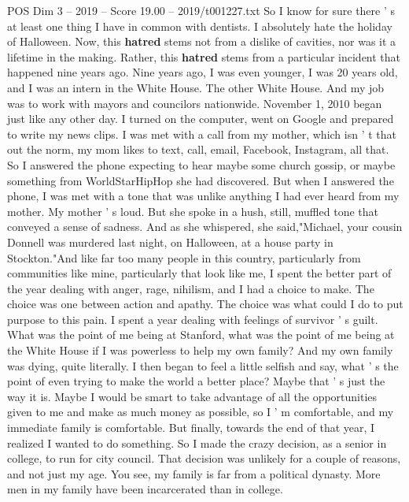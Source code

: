 \begin{textsample}{POS Dim 3 – 2019 – Score 19.00 – 2019/t001227.txt}  \label{ex:f3_pos_005}
So I know for sure there ' s at least one thing I have in common with dentists.
I absolutely hate the holiday of Halloween.
Now, this \textbf{hatred} stems not from a dislike of cavities, nor was it a lifetime in the making.
Rather, this \textbf{hatred} stems from a particular incident that happened nine years ago.
Nine years ago, I was even younger, I was 20 years old, and I was an intern in the White House.
The other White House.
And my job was to work with mayors and councilors nationwide.
November 1, 2010 began just like any other day.
I turned on the computer, went on Google and prepared to write my news clips.
I was met with a call from my mother, which isn ' t that out the norm, my mom likes to text, call, email, Facebook, Instagram, all that.
So I answered the phone expecting to hear maybe some church gossip, or maybe something from WorldStarHipHop she had discovered.
But when I answered the phone, I was met with a tone that was unlike anything I had ever heard from my mother.
My mother ' s loud.
But she spoke in a hush, still, muffled tone that conveyed a sense of sadness.
And as she whispered, she said,"Michael, your cousin Donnell was murdered last night, on Halloween, at a house party in Stockton."And like far too many people in this country, particularly from communities like mine, particularly that look like me, I spent the better part of the year dealing with anger, rage, nihilism, and I had a choice to make.
The choice was one between action and apathy.
The choice was what could I do to put purpose to this pain.
I spent a year dealing with feelings of survivor ' s guilt.
What was the point of me being at Stanford, what was the point of me being at the White House if I was powerless to help my own family?
And my own family was dying, quite literally.
I then began to feel a little selfish and say, what ' s the point of even trying to make the world a better place?
Maybe that ' s just the way it is.
Maybe I would be smart to take advantage of all the opportunities given to me and make as much money as possible, so I ' m comfortable, and my immediate family is comfortable.
But finally, towards the end of that year, I realized I wanted to do something.
So I made the crazy decision, as a senior in college, to run for city council.
That decision was unlikely for a couple of reasons, and not just my age.
You see, my family is far from a political dynasty.
More men in my family have been incarcerated than in college.

\end{textsample}
